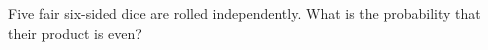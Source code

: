 Five fair six-sided dice are rolled independently. What is the probability that their product is even?
